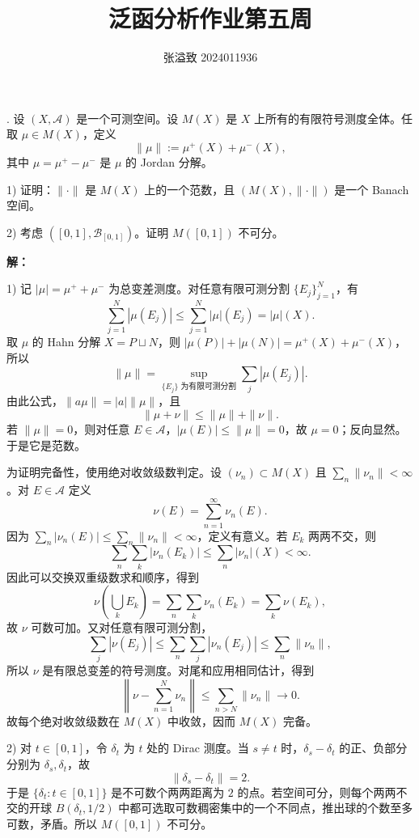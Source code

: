 \documentclass{article}
\title{泛函分析作业第五周}
\author{张溢致 2024011936}
\date{}
\begin{document}
\maketitle

\par\medskip{}. 设 $(X,\mathcal A)$ 是一个可测空间。设 $M(X)$ 是 $X$ 上所有的有限符号测度全体。任取 $\mu\in M(X)$，定义
\[
\|\mu\|:=\mu^+(X)+\mu^-(X),
\]
其中 $\mu=\mu^+-\mu^-$ 是 $\mu$ 的 Jordan 分解。

1) 证明：$\|\cdot\|$ 是 $M(X)$ 上的一个范数，且 $(M(X),\|\cdot\|)$ 是一个 Banach 空间。

2) 考虑 $([0,1],\mathcal B_{[0,1]})$。证明 $M([0,1])$ 不可分。


\par{}\noindent\textbf{解：}\par\nopagebreak[4]



1) 记 $|\mu|=\mu^++\mu^-$ 为总变差测度。对任意有限可测分割 $\{E_j\}_{j=1}^N$，有
\[
\sum_{j=1}^N|\mu(E_j)|\le\sum_{j=1}^N|\mu|(E_j)=|\mu|(X).
\]
取 $\mu$ 的 Hahn 分解 $X=P\sqcup N$，则 $|\mu(P)|+|\mu(N)|=\mu^+(X)+\mu^-(X)$，所以
\[
\|\mu\|=\sup_{\{E_j\}\text{ 为有限可测分割}}\sum_j|\mu(E_j)|.
\]
由此公式，$\|a\mu\|=|a|\|\mu\|$，且
\[
\|\mu+\nu\|\le\|\mu\|+\|\nu\|.
\]
若 $\|\mu\|=0$，则对任意 $E\in\mathcal A$，$|\mu(E)|\le\|\mu\|=0$，故 $\mu=0$；反向显然。于是它是范数。

为证明完备性，使用绝对收敛级数判定。设 $(\nu_n)\subset M(X)$ 且 $\sum_n\|\nu_n\|<\infty$。对 $E\in\mathcal A$ 定义
\[
\nu(E)=\sum_{n=1}^\infty\nu_n(E).
\]
因为 $\sum_n|\nu_n(E)|\le\sum_n\|\nu_n\|<\infty$，定义有意义。若 $E_k$ 两两不交，则
\[
\sum_n\sum_k|\nu_n(E_k)|\le\sum_n|\nu_n|(X)<\infty.
\]
因此可以交换双重级数求和顺序，得到
\[
\nu\left(\bigcup_kE_k\right)=\sum_n\sum_k\nu_n(E_k)=\sum_k\nu(E_k),
\]
故 $\nu$ 可数可加。又对任意有限可测分割，
\[
\sum_j|\nu(E_j)|\le\sum_n\sum_j|\nu_n(E_j)|\le\sum_n\|\nu_n\|,
\]
所以 $\nu$ 是有限总变差的符号测度。对尾和应用相同估计，得到
\[
\left\|\nu-\sum_{n=1}^N\nu_n\right\|\le\sum_{n>N}\|\nu_n\|\longrightarrow0.
\]
故每个绝对收敛级数在 $M(X)$ 中收敛，因而 $M(X)$ 完备。

2) 对 $t\in[0,1]$，令 $\delta_t$ 为 $t$ 处的 Dirac 测度。当 $s\ne t$ 时，$\delta_s-\delta_t$ 的正、负部分分别为 $\delta_s,\delta_t$，故
\[
\|\delta_s-\delta_t\|=2.
\]
于是 $\{\delta_t:t\in[0,1]\}$ 是不可数个两两距离为 $2$ 的点。若空间可分，则每个两两不交的开球 $B(\delta_t,1/2)$ 中都可选取可数稠密集中的一个不同点，推出球的个数至多可数，矛盾。所以 $M([0,1])$ 不可分。
\end{document}

